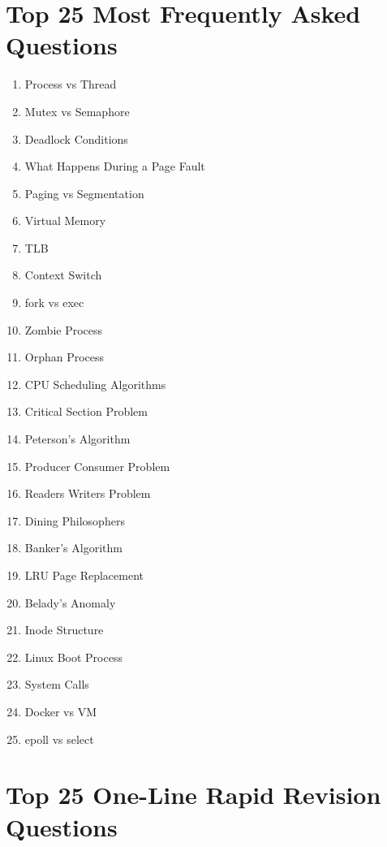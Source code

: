 \section{Top 25 Most Frequently Asked Questions}

\begin{enumerate}
\item Process vs Thread
\item Mutex vs Semaphore
\item Deadlock Conditions
\item What Happens During a Page Fault
\item Paging vs Segmentation
\item Virtual Memory
\item TLB
\item Context Switch
\item fork vs exec
\item Zombie Process
\item Orphan Process
\item CPU Scheduling Algorithms
\item Critical Section Problem
\item Peterson's Algorithm
\item Producer Consumer Problem
\item Readers Writers Problem
\item Dining Philosophers
\item Banker's Algorithm
\item LRU Page Replacement
\item Belady's Anomaly
\item Inode Structure
\item Linux Boot Process
\item System Calls
\item Docker vs VM
\item epoll vs select
\end{enumerate}

\section{Top 25 One-Line Rapid Revision Questions}

